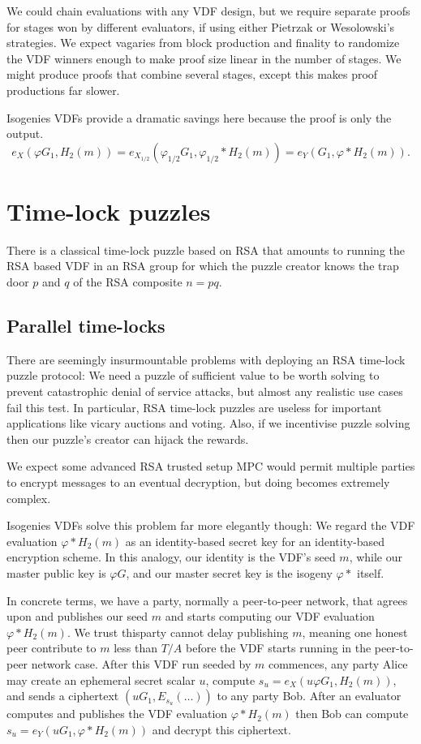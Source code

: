 \documentclass{article}
\newcommand\mathperiod{.}
\begin{document}
We could chain evaluations with any VDF design, but we require separate proofs for stages won by different evaluators, if using either Pietrzak or Wesolowski's strategies.  We expect vagaries from block production and finality to randomize the VDF winners enough to make proof size linear in the number of stages.  We might produce proofs that combine several stages, except this makes proof productions far slower.

Isogenies VDFs provide a dramatic savings here because the proof is only the output.
$$ e_X( φ G_1, H_2(m) ) = e_{X_{1/2}}( φ_{1/2} G_1, φ_{1/2}* H_2(m) ) = e_Y( G_1, φ* H_2(m) ) \mathperiod $$


\section{Time-lock puzzles}


There is a classical time-lock puzzle based on RSA \cite{TLP} that
amounts to running the RSA based VDF in an RSA group for which the
puzzle creator knows the trap door $p$ and $q$ of the RSA composite
$n = p q$.  

\subsection{Parallel time-locks}

There are seemingly insurmountable problems with deploying an RSA
time-lock puzzle protocol:
We need a puzzle of sufficient value to be worth solving to prevent
catastrophic denial of service attacks, but almost any realistic use
cases fail this test.  In particular, RSA time-lock puzzles are
useless for important applications like vicary auctions and voting. 
Also, if we incentivise puzzle solving then our puzzle's creator can
hijack the rewards.  

We expect some advanced RSA trusted setup MPC would permit multiple
parties to encrypt messages to an eventual decryption, but doing 
becomes extremely complex.

Isogenies VDFs solve this problem far more elegantly though:
We regard the VDF evaluation $φ* H_2(m)$ as an identity-based secret
key for an identity-based encryption scheme.  In this analogy, our
identity is the VDF's seed $m$, while our master public key is $φ G$,
and our master secret key is the isogeny $φ*$ itself.

In concrete terms, we have a party, normally a peer-to-peer network,
that agrees upon and publishes our seed $m$ and starts computing our
VDF evaluation $φ* H_2(m)$.  We trust thisparty cannot delay publishing
$m$, meaning one honest peer contribute to $m$ less than $T/A$ before
the VDF starts running in the peer-to-peer network case.
After this VDF run seeded by $m$ commences, any party Alice may create
an ephemeral secret scalar $u$, compute $s_u = e_X ( u φ G_1, H_2(m) )$,
and sends a ciphertext $(u G_1, E_{s_u}(\ldots))$ to any party Bob.
After an evaluator computes and publishes the VDF evaluation
$φ* H_2(m)$ then Bob can compute $s_u = e_Y ( u G_1, φ* H_2(m) )$ and
decrypt this ciphertext.
\end{document}
